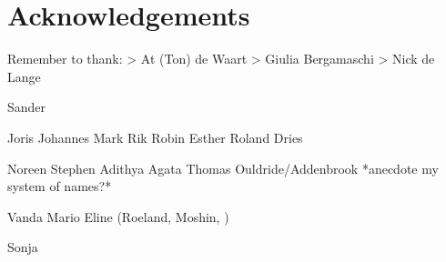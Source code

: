 



\chapter*{Acknowledgements}


Remember to thank:
> At (Ton) de Waart
> Giulia Bergamaschi
> Nick de Lange

Sander

Joris
Johannes
Mark
Rik
Robin
Esther
Roland Dries

Noreen
Stephen
Adithya
Agata
Thomas Ouldride/Addenbrook *anecdote my system of names?*

Vanda
Mario
Eline
(Roeland, Moshin, )

Sonja


